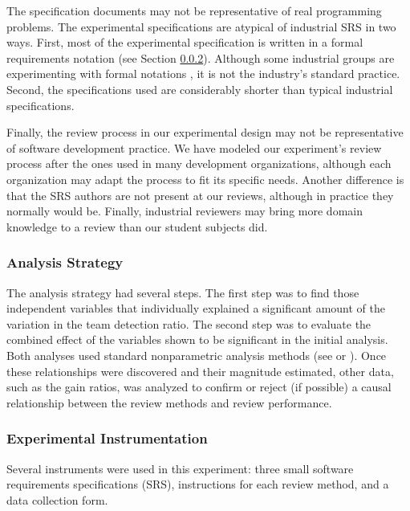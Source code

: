 The specification documents may not be representative of real 
programming problems. The experimental specifications are atypical
of industrial SRS in two ways. First, most of the experimental 
specification is written in a formal requirements notation (see 
Section \ref{instruments}). Although some industrial groups 
are experimenting with formal notations \cite{ardis.1994,GCR.formal}, it is
not the industry's standard practice. Second, the specifications
used are considerably shorter than typical industrial specifications.

Finally, the review process in our experimental design may not be 
representative of software development practice. We have modeled our
experiment's review process after the ones used in many
development organizations, although each organization may 
adapt the process to fit its specific needs.
Another difference is that the SRS authors are not present at our reviews,
although in practice they normally would be.  Finally, industrial reviewers may 
bring more domain knowledge to a review than our student subjects did.

\subsubsection{Analysis Strategy}\label{sec:danalstrat}
\label{analysis}

The analysis strategy had several steps.
The first step was to find those independent variables 
that individually explained a significant amount
of the variation in the team detection ratio.
The second step was to evaluate the combined effect 
of the variables shown to be significant 
in the initial analysis.  Both analyses used 
standard nonparametric analysis methods 
(see \cite{BHH:Statistics} or \cite{Heiberger.1989}).
Once these relationships were discovered and their magnitude
estimated, other data, such as the gain ratios, was analyzed
to confirm or reject (if possible) a causal relationship 
between the review methods and review performance. 


\subsubsection{Experimental Instrumentation}  
\label{instruments}
Several instruments were used in this experiment: three small
software requirements specifications (SRS), instructions 
for each review method, and a data collection form. 

